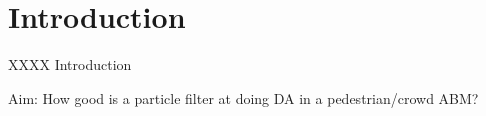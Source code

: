 \section{Introduction\label{introduction}}

XXXX Introduction

Aim: How good is a particle filter at doing DA in a pedestrian/crowd ABM?

